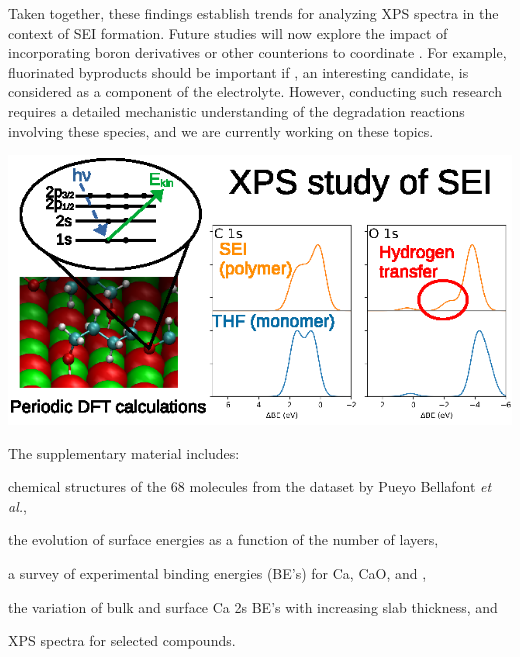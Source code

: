 \documentclass[journal=jpccck,manuscript=article]{achemso}
\begin{document}
Taken together, these findings establish trends for analyzing XPS spectra in the context of SEI formation. Future studies will now explore the impact of incorporating boron derivatives or other counterions to coordinate . For example, fluorinated byproducts should be important if  , an interesting candidate,\cite{bodinBoronBasedFunctionalAdditives2023} is considered as a component of the electrolyte. However, conducting such research requires a detailed mechanistic understanding of the degradation reactions involving these species,\cite{youngPreventingElectrolyteDecomposition2021,yamijalaStabilityCalciumIon2021,baonguyenInvestigatingAbnormalConductivity2022,nguyenSolvationReductionCoupling2023} and we are currently working on these topics.

 \cite{ebadiInsightsLiMetalOrganic2019}


\begin{tocentry}
	\includegraphics{TOC}
\end{tocentry}


\begin{suppinfo}
	The supplementary material includes: \begin{inparaenum}[(i)]
		\item chemical structures of the 68 molecules from the dataset by Pueyo Bellafont \textit{et al.}\cite{pueyobellafontPredictingCoreLevel2017},
		\item the evolution of surface energies as a function of the number of layers,
		\item a survey of experimental binding energies (BE's) for Ca, CaO, and ,
		\item the variation of bulk and surface Ca 2s BE's with increasing slab thickness, and
		\item XPS spectra for selected compounds.
	\end{inparaenum}
\end{suppinfo}
\end{document}
